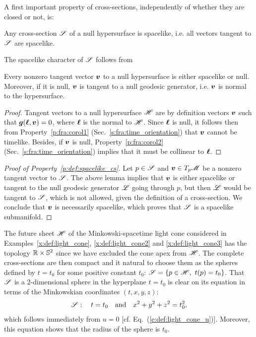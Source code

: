 A first important property of cross-sections, independently of whether they are closed or not,
is:
\begin{prop}
\label{p:def:spacelike_cs}
Any cross-section $\mathscr{S}$ of a null hypersurface is spacelike,
i.e. all vectors tangent to $\mathscr{S}$ are spacelike.
\end{prop}
The spacelike character of $\mathscr{S}$ follows from
\begin{lemma}
\label{p:def:tangent_to_null_hyp}
Every nonzero tangent vector $\bm{v}$ to a null hypersurface is either spacelike or null.
Moreover, if it is null, $\bm{v}$ is tangent to a null geodesic generator, i.e. $\bm{v}$ is normal
to the hypersurface.
\end{lemma}
\begin{proof}
Tangent vectors to a null hypersurface $\mathscr{H}$ are by definition
vectors $\bm{v}$ such that $\bm{g}(\bm{\ell},\bm{v})=0$, where $\bm{\ell}$ is the normal
to $\mathscr{H}$. Since $\bm{\ell}$ is null, it follows then from Property~\ref{p:fra:corol1}
(Sec.~\ref{s:fra:time_orientation}) that $\bm{v}$ cannot be timelike.
Besides, if $\bm{v}$ is null, Property~\ref{p:fra:corol2} (Sec.~\ref{s:fra:time_orientation})
implies that it must be collinear to $\bm{\ell}$.
\end{proof}
\begin{proof}[Proof of Property~\ref{p:def:spacelike_cs}]
Let $p \in \mathscr{S}$ and $\bm{v}\in T_p\mathscr{M}$ be a nonzero tangent vector to $\mathscr{S}$.
The above lemma implies that $\bm{v}$ is either spacelike or tangent to the
null geodesic generator $\mathscr{L}$ going through $p$, but then $\mathscr{L}$ would be tangent to $\mathscr{S}$,
which is not allowed, given the definition of a cross-section. We conclude
that $\bm{v}$ is necessarily spacelike, which proves that $\mathscr{S}$ is a spacelike
submanifold.
\end{proof}

\begin{example} \label{x:def:light_cone4}
The future sheet $\mathscr{H}$ of the Minkowski-spacetime light cone considered in
Examples~\ref{x:def:light_cone},
\ref{x:def:light_cone2} and \ref{x:def:light_cone3} has the topology $\mathbb{R} \times \mathbb{S}^2$
since we have excluded the cone apex from $\mathscr{H}$.
The complete cross-sections are then compact and it natural to choose them as the
spheres defined by $t=t_0$ for some positive constant $t_0$:
$\mathscr{S} = \left\{ p \in \mathscr{H},\  t(p) = t_0 \right\}$.
That $\mathscr{S}$ is a 2-dimensional sphere in the hyperplane $t=t_0$ is clear on its equation in terms
of the Minkowskian coordinates $(t,x,y,z)$:
\[
\mathscr{S}: \quad t=t_0 \quad\mbox{and}\quad x^2+y^2+z^2 = t_0^2,
\]
which follows immediately from $u=0$
[cf. Eq.~(\ref{e:def:light_cone_u})]. Moreover, this equation shows that the
radius of the sphere is $t_0$.
\end{example}

